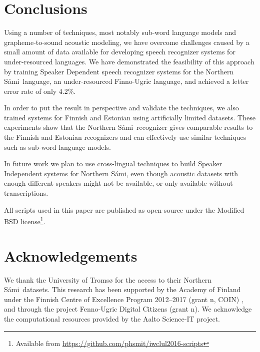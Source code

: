 \documentclass[b5paper]{article}
\newcommand{\note}[1]{{\textcolor{blue}{#1}}}
\newcommand{\ns}{Northern Sámi}
\begin{document}
\section{Conclusions} 
Using a number of techniques, most notably sub-word language models and grapheme-to-sound acoustic modeling, we have overcome challenges caused by a small amount of data available for developing speech recognizer systems for under-resourced languages. We have demonstrated the feasibility of this approach by training Speaker Dependent speech recognizer systems for the \ns\ language, an under-resourced Finno-Ugric language, and achieved a letter error rate of only 4.2\%. 

In order to put the result in perspective and validate the techniques, we also trained systems
 for Finnish and Estonian using artificially limited datasets. These experiments show that the \ns\ recognizer gives comparable results to the Finnish and Estonian recognizers and can effectively use  similar techniques such as sub-word language models.

In future work we plan to use cross-lingual techniques to build Speaker Independent systems for \ns, even though acoustic datasets with enough different speakers might not be available, or only available without transcriptions.

All scripts used in this paper are published as open-source under the Modified BSD license\footnote{Available from \url{https://github.com/phsmit/iwclul2016-scripts}}. 





\section{Acknowledgements} 
We thank the University of Tromsø for the access to their \ns\ datasets.  This research has been supported by the Academy of Finland under the Finnish Centre of Excellence Program 2012--2017 (grant n, COIN) , and through the project Fenno-Ugric Digital Citizens (grant n).
We acknowledge the computational resources provided by the Aalto Science-IT project. 




 
\end{document}
